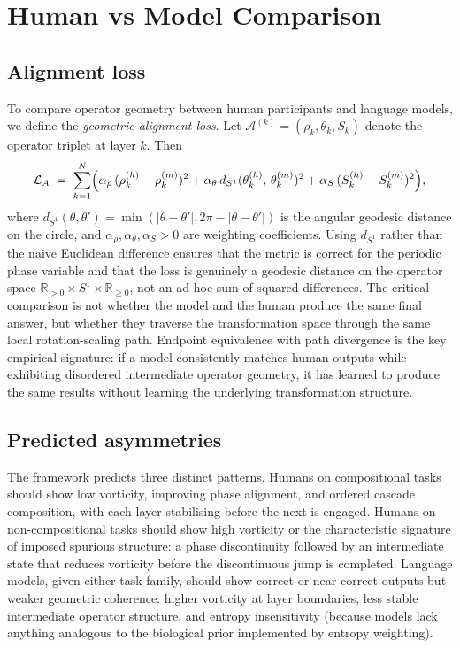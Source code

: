 \documentclass[12pt, a4paper]{article}
\theoremstyle{remark}
\theoremstyle{definition}
\begin{document}
\section{Human vs Model Comparison}
\label{sec:comparison}

\subsection{Alignment loss}

To compare operator geometry between human participants and language models, we define the
\emph{geometric alignment loss}.  Let $\mathcal{A}^{(k)} = (\rho_k, \theta_k, S_k)$ denote
the operator triplet at layer $k$.  Then
\begin{equation}
  \mathcal{L}_A \;=\; \sum_{k=1}^{N} \Bigl(
    \alpha_\rho\,(\rho_k^{(h)} - \rho_k^{(m)})^2
    + \alpha_\theta\,d_{S^1}(\theta_k^{(h)},\, \theta_k^{(m)})^2
    + \alpha_S\,(S_k^{(h)} - S_k^{(m)})^2
  \Bigr),
  \label{eq:alignloss}
\end{equation}
where $d_{S^1}(\theta, \theta') = \min(|\theta - \theta'|, 2\pi - |\theta - \theta'|)$ is
the angular geodesic distance on the circle, and $\alpha_\rho, \alpha_\theta, \alpha_S > 0$
are weighting coefficients.  Using $d_{S^1}$ rather than the naive Euclidean difference
ensures that the metric is correct for the periodic phase variable and that the loss is
genuinely a geodesic distance on the operator space $\mathbb{R}_{>0} \times S^1 \times
\mathbb{R}_{\ge 0}$, not an ad hoc sum of squared differences.
The critical comparison is not whether the model and the human produce the same final
answer, but whether they traverse the transformation space through the same local
rotation-scaling path.  Endpoint equivalence with path divergence is the key empirical
signature: if a model consistently matches human outputs while exhibiting disordered
intermediate operator geometry, it has learned to produce the same results without learning
the underlying transformation structure.

\subsection{Predicted asymmetries}

The framework predicts three distinct patterns.  Humans on compositional tasks should show
low vorticity, improving phase alignment, and ordered cascade composition, with each layer
stabilising before the next is engaged.  Humans on non-compositional tasks should show
high vorticity or the characteristic signature of imposed spurious structure: a phase
discontinuity followed by an intermediate state that reduces vorticity before the
discontinuous jump is completed.  Language models, given either task family, should show
correct or near-correct outputs but weaker geometric coherence: higher vorticity at layer
boundaries, less stable intermediate operator structure, and entropy insensitivity (because
models lack anything analogous to the biological prior implemented by entropy weighting).
\end{document}

